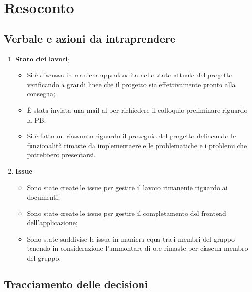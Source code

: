 \section{Resoconto}
\subsection{Verbale e azioni da intraprendere}

\begin{enumerate}
	\item \textbf{Stato dei lavori};
	\begin{itemize}
		\item Si è discusso in maniera approfondita dello stato attuale del progetto verificando a grandi linee che il progetto sia effettivamente pronto alla consegna;
		\item È stata inviata una mail al \commitNameS{} per richiedere il colloquio preliminare riguardo la PB;
		\item Si è fatto un riassunto riguardo il proseguio del progetto delineando  le funzionalità rimaste da implementaere e le problematiche e i problemi che potrebbero presentarsi.
	\end{itemize}

	\item \textbf{Issue}
	\begin{itemize}
		\item Sono state create le issue  per gestire il lavoro rimanente riguardo ai documenti;
		\item Sono state create le issue per gestire il completamento del frontend dell'applicazione;
		\item Sono state suddivise le issue in maniera equa tra i membri del gruppo tenendo in considerazione l'ammontare di ore rimaste per ciascun membro del gruppo.
	\end{itemize}
\end{enumerate}

\pagebreak

\subsection{Tracciamento delle decisioni}

